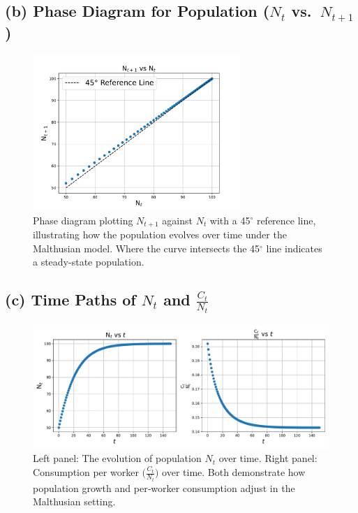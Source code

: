 \documentclass[12pt]{article}
\begin{document}
\subsection*{(b) Phase Diagram for Population ($N_t$ vs.\ $N_{t+1}$)}
\begin{figure}[H]
    \centering
    \includegraphics[width=0.7\textwidth]{1(b).pdf}
    \caption{Phase diagram plotting $N_{t+1}$ against $N_{t}$ with a 45$^\circ$ reference line,
    illustrating how the population evolves over time under the Malthusian model.
    Where the curve intersects the 45$^\circ$ line indicates a steady-state population.}
    \label{fig:nt_vs_ntplus1}
\end{figure}

\subsection*{(c) Time Paths of $N_t$ and $\frac{C_t}{N_t}$}
\begin{figure}[H]
    \centering
    \includegraphics[width=1\textwidth]{1(c).pdf}
    \caption{Left panel: The evolution of population $N_t$ over time. 
    Right panel: Consumption per worker $\bigl(\tfrac{C_t}{N_t}\bigr)$ over time. 
    Both demonstrate how population growth and per‐worker consumption adjust in the Malthusian setting.}
    \label{fig:1(c)}
\end{figure}
\end{document}
